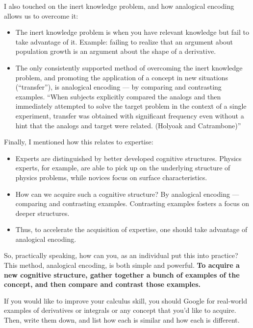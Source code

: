I also touched on the inert knowledge problem, and how analogical
encoding allows us to overcome it:

\begin{itemize}
\itemsep1pt\parskip0pt
\item
  The inert knowledge problem is when you have relevant knowledge but
  fail to take advantage of it. Example: failing to realize that an
  argument about population growth is an argument about the shape of a
  derivative.
\item
  The only consistently supported method of overcoming the inert knowledge
  problem, and promoting the application of a concept in new situations
  (``transfer''), is analogical encoding --- by comparing and contrasting
  examples. ``When subjects explicitly compared the analogs and then
  immediately attempted to solve the target problem in the context of a
  single experiment, transfer was obtained with significant frequency
  even without a hint that the analogs and target were related. (Holyoak
  and Catrambone)''
\end{itemize}

Finally, I mentioned how this relates to expertise:

\begin{itemize}
\itemsep1pt\parskip0pt
\item
  Experts are distinguished by better developed cognitive structures.
  Physics experts, for example, are able to pick up on the underlying
  structure of physics problems, while novices focus on surface
  characteristics.
\item
  How can we acquire such a cognitive structure? By analogical encoding
  --- comparing and contrasting examples. Contrasting examples fosters a
  focus on deeper structures.
\item
  Thus, to accelerate the acquisition of expertise, one should take
  advantage of analogical encoding.
\end{itemize}

So, practically speaking, how can you, as an individual put this into
practice? This method, analogical encoding, is both simple and powerful.
\textbf{To acquire a new cognitive structure, gather together a bunch of
examples of the concept, and then compare and contrast those examples.}

If you would like to improve your calculus skill, you should Google for
real-world examples of derivatives or integrals or any concept that
you'd like to acquire. Then, write them down, and list how each is
similar and how each is different.

